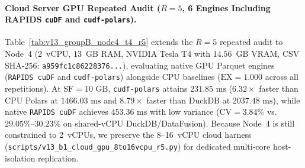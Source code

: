 \documentclass[10pt,a4paper]{article}
\begin{document}
\paragraph{Cloud Server GPU Repeated Audit ($R=5$, 6 Engines Including RAPIDS \texttt{cuDF} and \texttt{cudf-polars}).}
Table~\ref{tab:v13_groupB_node4_t4_r5} extends the $R=5$ repeated audit to Node~4 (2~vCPU, $13$~GB RAM, NVIDIA Tesla T4 with $14.56$~GB VRAM, CSV SHA-256: \texttt{a959fc1c86228376...}), evaluating native GPU Parquet engines (\texttt{RAPIDS cuDF} and \texttt{cudf-polars}) alongside CPU baselines ($\text{EX}=1.000$ across all repetitions). At $\text{SF}=10\text{ GB}$, \texttt{cudf-polars} attains $231.85\text{ ms}$ ($6.32\times$ faster than CPU Polars at $1466.03\text{ ms}$ and $8.79\times$ faster than DuckDB at $2037.48\text{ ms}$), while native \texttt{RAPIDS cuDF} achieves $453.36\text{ ms}$ with low variance ($\text{CV}=3.84\%$ vs.\ $29.05\%\text{--}30.23\%$ on shared-vCPU DuckDB/DataFusion). Because Node~4 is still constrained to 2~vCPUs, we preserve the 8--16~vCPU cloud harness (\texttt{scripts/\allowbreak{}v13\_\allowbreak{}b1\_\allowbreak{}cloud\_\allowbreak{}gpu\_\allowbreak{}8to16vcpu\_\allowbreak{}r5.py}) for dedicated multi-core host-isolation replication.
\end{document}
